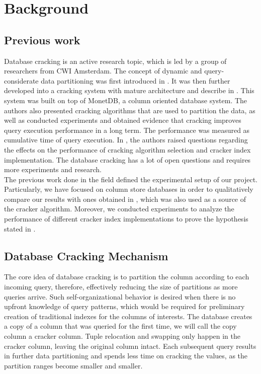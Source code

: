 \section{Background}
\label{sec:background}
\subsection{Previous work}
Database cracking is an active research topic, which is led by a group of researchers from CWI Amsterdam. The concept of dynamic and query-considerate data partitioning was first introduced in \cite{kersten_2005}. It was then further developed into a cracking system with mature architecture and describe in \cite{idreos_2007}. This system was built on top of MonetDB, a column oriented database system. The authors also presented cracking algorithms that are used to partition the data, as well as conducted experiments and obtained evidence that cracking improves query execution performance in a long term. The performance was measured as cumulative time of query execution. In \cite{schuhknecht_2014}, the authors raised questions regarding the effects on the performance of cracking algorithm selection and cracker index implementation. The database cracking has a lot of open questions and requires more experiments and research.\\
The previous work done in the field defined the experimental setup of our project. Particularly, we have focused on column store databases in order to qualitatively compare our results with ones obtained in \cite{idreos_2007}, which was also used as a source of the cracker algorithm. Moreover, we conducted experiments to analyze the performance of different cracker index implementations to prove the hypothesis stated in \cite{schuhknecht_2014}.

\subsection{Database Cracking Mechanism}
The core idea of database cracking is to partition the column according to each incoming query, therefore, effectively reducing the size of partitions as more queries arrive. Such self-organizational behavior is desired when there is no upfront knowledge of query patterns, which would be required for preliminary creation of traditional indexes for the columns of interests. The database creates a copy of a column that was queried for the first time, we will call the copy column a cracker column. Tuple relocation and swapping only happen in the cracker column, leaving the original column intact. Each subsequent query results in further data partitioning and spends less time on cracking the values, as the partition ranges become smaller and smaller.


